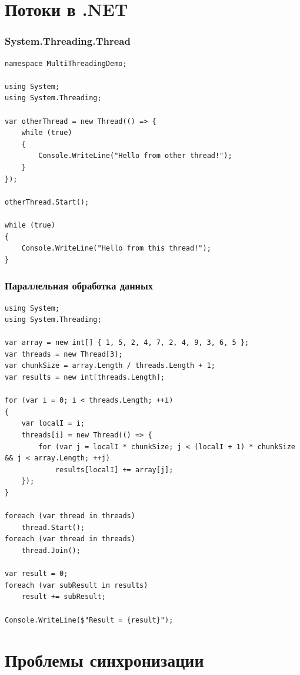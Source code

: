 \documentclass{../../slides-style}
\begin{document}
    \section{Потоки в .NET}

    \begin{frame}[fragile]
        \frametitle{System.Threading.Thread}
        \begin{footnotesize}
            \begin{verbatim}
namespace MultiThreadingDemo;

using System;
using System.Threading;

var otherThread = new Thread(() => {
    while (true)
    {
        Console.WriteLine("Hello from other thread!");
    }
});

otherThread.Start();

while (true)
{
    Console.WriteLine("Hello from this thread!");
}
            \end{verbatim}
        \end{footnotesize}
    \end{frame}

    \begin{frame}[fragile]
        \frametitle{Параллельная обработка данных}
        \begin{ssmall}
            \begin{verbatim}
using System;
using System.Threading;

var array = new int[] { 1, 5, 2, 4, 7, 2, 4, 9, 3, 6, 5 };
var threads = new Thread[3];
var chunkSize = array.Length / threads.Length + 1;
var results = new int[threads.Length];

for (var i = 0; i < threads.Length; ++i) 
{
    var localI = i;
    threads[i] = new Thread(() => {
        for (var j = localI * chunkSize; j < (localI + 1) * chunkSize && j < array.Length; ++j)
            results[localI] += array[j];
    });
}

foreach (var thread in threads)
    thread.Start();
foreach (var thread in threads)
    thread.Join();

var result = 0;
foreach (var subResult in results)
    result += subResult;

Console.WriteLine($"Result = {result}");
            \end{verbatim}
        \end{ssmall}
    \end{frame}

    \section{Проблемы синхронизации}
\end{document}
